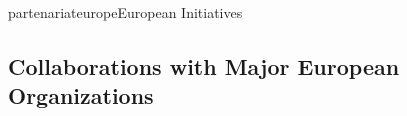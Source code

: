 \documentclass{ra2018}
\begin{document}
\begin{module}{partenariat}{europe}{European Initiatives}
\subsection{Collaborations with Major European Organizations}



\end{module}


    
\end{document}
